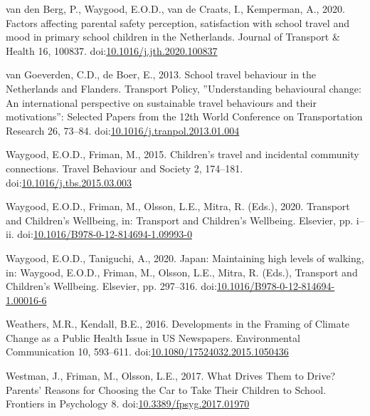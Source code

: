\documentclass[]{elsarticle} %
\begin{document}
\leavevmode\hypertarget{ref-vandenbergFactorsAffectingParental2020}{}%
van den Berg, P., Waygood, E.O.D., van de Craats, I., Kemperman, A.,
2020. Factors affecting parental safety perception, satisfaction with
school travel and mood in primary school children in the Netherlands.
Journal of Transport \& Health 16, 100837.
doi:\href{https://doi.org/10.1016/j.jth.2020.100837}{10.1016/j.jth.2020.100837}

\leavevmode\hypertarget{ref-vangoeverdenSchoolTravelBehaviour2013}{}%
van Goeverden, C.D., de Boer, E., 2013. School travel behaviour in the
Netherlands and Flanders. Transport Policy, ''Understanding behavioural
change: An international perspective on sustainable travel behaviours
and their motivations'': Selected Papers from the 12th World Conference
on Transportation Research 26, 73--84.
doi:\href{https://doi.org/10.1016/j.tranpol.2013.01.004}{10.1016/j.tranpol.2013.01.004}

\leavevmode\hypertarget{ref-waygoodChildrenTravelIncidental2015}{}%
Waygood, E.O.D., Friman, M., 2015. Children's travel and incidental
community connections. Travel Behaviour and Society 2, 174--181.
doi:\href{https://doi.org/10.1016/j.tbs.2015.03.003}{10.1016/j.tbs.2015.03.003}

\leavevmode\hypertarget{ref-waygoodTransportChildrenWellbeing2020}{}%
Waygood, E.O.D., Friman, M., Olsson, L.E., Mitra, R. (Eds.), 2020.
Transport and Children's Wellbeing, in: Transport and Children's
Wellbeing. Elsevier, pp. i--ii.
doi:\href{https://doi.org/10.1016/B978-0-12-814694-1.09993-0}{10.1016/B978-0-12-814694-1.09993-0}

\leavevmode\hypertarget{ref-waygoodJapanMaintainingHigh2020}{}%
Waygood, E.O.D., Taniguchi, A., 2020. Japan: Maintaining high levels of
walking, in: Waygood, E.O.D., Friman, M., Olsson, L.E., Mitra, R.
(Eds.), Transport and Children's Wellbeing. Elsevier, pp. 297--316.
doi:\href{https://doi.org/10.1016/B978-0-12-814694-1.00016-6}{10.1016/B978-0-12-814694-1.00016-6}

\leavevmode\hypertarget{ref-weathersDevelopmentsFramingClimate2016}{}%
Weathers, M.R., Kendall, B.E., 2016. Developments in the Framing of
Climate Change as a Public Health Issue in US Newspapers. Environmental
Communication 10, 593--611.
doi:\href{https://doi.org/10.1080/17524032.2015.1050436}{10.1080/17524032.2015.1050436}

\leavevmode\hypertarget{ref-westmanWhatDrivesThem2017}{}%
Westman, J., Friman, M., Olsson, L.E., 2017. What Drives Them to
Drive?Parents' Reasons for Choosing the Car to Take Their Children to
School. Frontiers in Psychology 8.
doi:\href{https://doi.org/10.3389/fpsyg.2017.01970}{10.3389/fpsyg.2017.01970}
\end{document}
